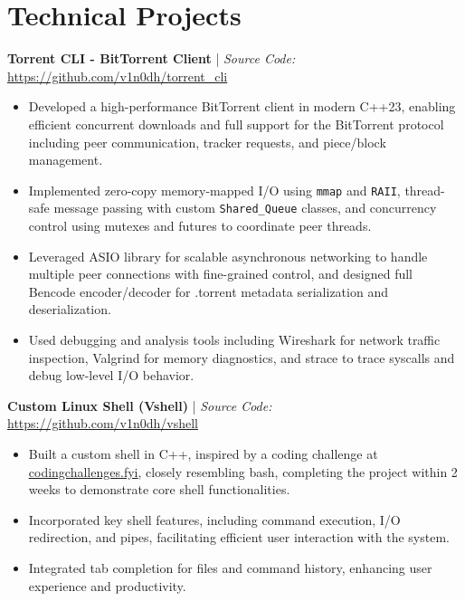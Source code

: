 \documentclass[10pt, letterpad, sans]{extarticle}
\newcommand{\projsection}[2] {
	\raggedright{\normalsize\bfseries{#1}} | {\small \textit{Source Code:} \hspace{0.1em} \href{#2}{#2}}
}
\begin{document}
\section{Technical Projects}
\vspace*{0.5em}
\projsection
{Torrent CLI - BitTorrent Client}
{https://github.com/v1n0dh/torrent\_cli}
\begin{itemize}[leftmargin=6mm]
	\item{Developed a high-performance BitTorrent client in modern C++23, enabling efficient concurrent downloads and full support for the BitTorrent protocol including peer communication, tracker requests, and piece/block management.}
	\item{Implemented zero-copy memory-mapped I/O using \texttt{mmap} and \texttt{RAII}, thread-safe message passing with custom \texttt{Shared\_Queue} classes, and concurrency control using mutexes and futures to coordinate peer threads.}
	\item{Leveraged ASIO library for scalable asynchronous networking to handle multiple peer connections with fine-grained control, and designed full Bencode encoder/decoder for .torrent metadata serialization and deserialization.}
	\item{Used debugging and analysis tools including Wireshark for network traffic inspection, Valgrind for memory diagnostics, and strace to trace syscalls and debug low-level I/O behavior.}
\end{itemize}

\vspace*{0.5em}
\projsection
{Custom Linux Shell (Vshell)}
{https://github.com/v1n0dh/vshell}
\begin{itemize}[leftmargin=6mm]
	\item{Built a custom shell in C++, inspired by a coding challenge at \href{https://codingchallenges.fyi/challenges/challenge-shell}{\underline {codingchallenges.fyi}}, closely resembling bash, completing the project within 2 weeks to demonstrate core shell functionalities.}
	\item{Incorporated key shell features, including command execution, I/O redirection, and pipes, facilitating efficient user interaction with the system.}
	\item{Integrated tab completion for files and command history, enhancing user experience and productivity.}
\end{itemize}
\end{document}
